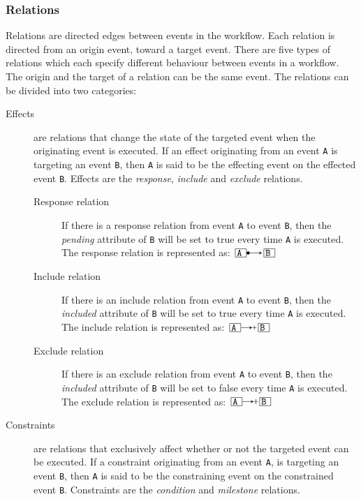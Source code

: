 \documentclass{article}
\begin{document}
			\subsubsection{Relations}
			\label{subsubsec:relations}

			Relations are directed edges between events in the workflow.
			Each relation is directed from an origin event, toward a target event.
			There are five types of relations which each specify different behaviour between events in a workflow.
			The origin and the target of a relation can be the same event.
			The relations can be divided into two categories:

			\begin{description}
				\item[Effects] are relations that change the state of the targeted event when the originating event is executed.
				If an effect originating from an event \texttt{A} is targeting an event \texttt{B}, then \texttt{A} is said to be the effecting event on the effected event \texttt{B}.
				Effects are the \emph{response}, \emph{include} and \emph{exclude} relations.
				\begin{description}
					\item[Response relation] If there is a response relation from event \texttt{A} to event \texttt{B}, then the \textit{pending} attribute of \texttt{B} will be set to true every time \texttt{A} is executed.
				The response relation is represented as: $\ev{A} \rrel \ev{B}$
					\item[Include relation] If there is an include relation from event \texttt{A} to event \texttt{B}, then the \textit{included} attribute of \texttt{B} will be set to true every time \texttt{A} is executed.
				The include relation is represented as: $\ev{A} \irel \ev{B}$
					\item[Exclude relation] If there is an exclude relation from event \texttt{A} to event \texttt{B}, then the \textit{included} attribute of \texttt{B} will be set to false every time \texttt{A} is executed.
				The exclude relation is represented as: $\ev{A} \erel \ev{B}$
				\end{description}
				\item[Constraints] are relations that exclusively affect whether or not the targeted event can be executed.
				If a constraint originating from an event \texttt{A}, is targeting an event \texttt{B}, then \texttt{A} is said to be the constraining event on the constrained event \texttt{B}.
				Constraints are the \emph{condition} and \emph{milestone} relations.

\end{description}
\end{document}
